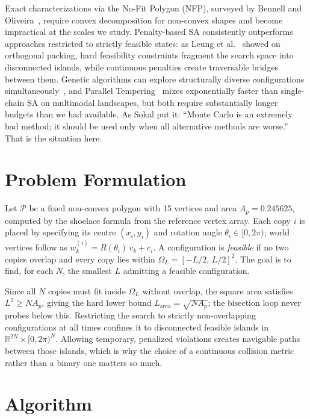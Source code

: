 \documentclass[10pt,twocolumn]{article}
\begin{document}
Exact characterizations via the No-Fit Polygon (NFP), surveyed by
Bennell and Oliveira~\cite{bennell2008}, require convex decomposition
for non-convex shapes and become impractical at the scales we study.
Penalty-based SA consistently outperforms approaches restricted to
strictly feasible states: as Leung et al.~\cite{leung2003} showed on
orthogonal packing, hard feasibility constraints fragment the search
space into disconnected islands, while continuous penalties create
traversable bridges between them. Genetic algorithms can explore
structurally diverse configurations simultaneously~\cite{burke2006},
and Parallel Tempering~\cite{hukushima1996} mixes exponentially faster
than single-chain SA on multimodal landscapes, but both require
substantially longer budgets than we had available. As Sokal put it:
``Monte Carlo is an extremely bad method; it should be used only when
all alternative methods are worse.'' That is the situation here.

\section{Problem Formulation}
\label{sec:formulation}

Let $\mathcal{P}$ be a fixed non-convex polygon with 15 vertices and
area $A_p = 0.245625$, computed by the shoelace formula from the
reference vertex array. Each copy $i$ is placed by specifying its
centre $(x_i, y_i)$ and rotation angle $\theta_i \in [0, 2\pi)$;
world vertices follow as $w_k^{(i)} = R(\theta_i)\,v_k + c_i$. A
configuration is \emph{feasible} if no two copies overlap and every
copy lies within $\Omega_L = [-L/2,\,L/2]^2$. The goal is to find,
for each $N$, the smallest $L$ admitting a feasible configuration.

Since all $N$ copies must fit inside $\Omega_L$ without overlap, the
square area satisfies $L^2 \geq N A_p$, giving the hard lower bound
$L_{\mathrm{area}} = \sqrt{N A_p}$; the bisection loop never probes
below this. Restricting the search to strictly non-overlapping
configurations at all times confines it to disconnected feasible
islands in $\mathbb{R}^{2N} \times [0, 2\pi)^N$. Allowing temporary,
penalized violations creates navigable paths between those islands,
which is why the choice of a continuous collision metric rather than a
binary one matters so much.

\section{Algorithm}
\label{sec:algorithm}
\end{document}
